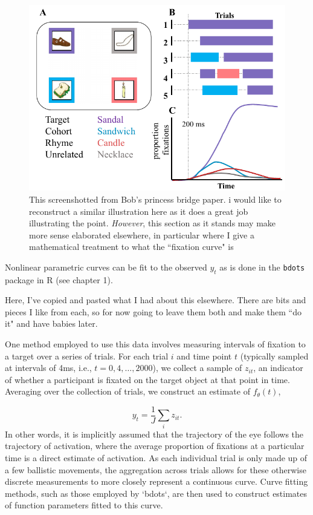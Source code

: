 \documentclass{article}
\newcommand{\xt}{\texttt}%
\begin{document}
\begin{figure}
\centering
\includegraphics[scale=0.45]{bob_vwp_full.png}
\caption{This screenshotted from Bob's princess bridge paper. i would like to reconstruct a similar illustration here as it does a great job illustrating the point. \textit{However}, this section as it stands may make more sense elaborated elsewhere, in particular where I give a mathematical treatment to what the ``fixation curve" is}
\label{fig:bob_diagram_full}
\end{figure}

Nonlinear parametric curves can be fit to the observed $y_t$ as is done in the \xt{bdots} package in R (see chapter 1).

Here, I've copied and pasted what I had about this elsewhere. There are bits and pieces I like from each, so for now going to leave them both and make them ``do it" and have babies later. 

One method employed to use this data involves measuring intervals of fixation to a target over a series of trials. For each trial $i$ and time point $t$ (typically sampled at intervals of 4ms, i.e., $t = 0, 4, \dots, 2000$), we collect a sample of $z_{it}$, an indicator of whether a participant is fixated on the target object at that point in time. Averaging over the collection of trials, we construct an estimate of $f_{\theta}(t)$, 

$$
y_t = \frac{1}{J} \sum_{i} z_{it}.
$$
In other words, it is implicitly assumed that the trajectory of the eye follows the trajectory of activation, where the average proportion of fixations at a particular time is a direct estimate of activation. As each individual trial is only made up of a few ballistic movements, the aggregation across trials allows for these otherwise discrete measurements to more closely represent a continuous curve. Curve fitting methods, such as those employed by `bdots`, are then used to construct estimates of function parameters fitted to this curve.
\end{document}
